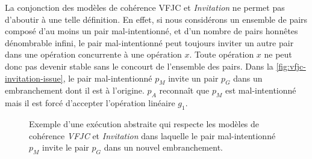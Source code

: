 La conjonction des modèles de cohérence \acs{VFJC} et \emph{Invitation} ne permet pas d'aboutir à une telle définition.
En effet, si nous considérons un ensemble de pairs composé d'au moins un pair mal-intentionné, et d'un nombre de pairs honnêtes dénombrable infini, le pair mal-intentionné peut toujours inviter un autre pair dans une opération concurrente à une opération $x$.
Toute opération $x$ ne peut donc pas devenir stable sans le concourt de l'ensemble des pairs.
Dans la \autoref{fig:vfjc-invitation-issue}, le pair mal-intentionné $p_M$ invite un pair $p_G$ dans un embranchement dont il est à l'origine.
$p_A$ reconnaît que $p_M$ est mal-intentionné mais il est forcé d'accepter l'opération linéaire $g_1$.

\begin{figure}[htb]
\centering
{}
\caption{Exemple  d'une exécution abstraite qui respecte les modèles de cohérence \emph{VFJC} et \emph{Invitation} dans laquelle le pair mal-intentionné $p_M$ invite le pair $p_G$ dans un nouvel embranchement.}\label{fig:vfjc-invitation-issue}
\end{figure}

